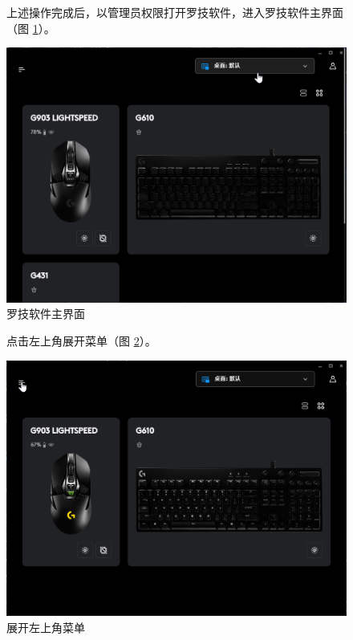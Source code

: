 \begin{figure}[H]
    \Centering
    \parbox[l]{\textwidth}{上述操作完成后，以管理员权限打开罗技软件，进入罗技软件主界面（图 \ref{ch0fig-lghub}）。}
    \includegraphics[width=\textwidth]{assets/intro/lghub.png}
    \caption{罗技软件主界面}
    \label{ch0fig-lghub}
\end{figure}

\begin{figure}[H]
    \Centering
    \parbox[l]{\textwidth}{点击左上角展开菜单（图 \ref{ch0fig-lghub-menu}）。}
    \includegraphics[width=\textwidth]{assets/intro/lghub_menu.png}
    \caption{展开左上角菜单}
    \label{ch0fig-lghub-menu}
\end{figure}

